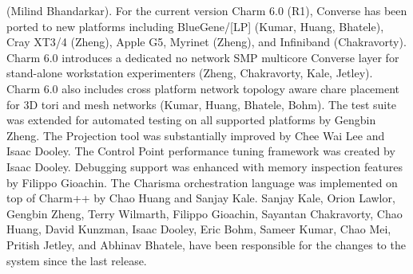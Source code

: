 (Milind Bhandarkar). For the current version Charm 6.0 (R1),
Converse has been ported to new platforms including BlueGene/[LP]
(Kumar, Huang, Bhatele), Cray XT3/4 (Zheng), Apple G5, Myrinet
(Zheng), and Infiniband (Chakravorty).  Charm 6.0 introduces a
dedicated no network SMP multicore Converse layer for stand-alone
workstation experimenters (Zheng, Chakravorty, Kale, Jetley).
Charm 6.0 also includes cross platform network topology aware
chare placement for 3D tori and mesh networks (Kumar, Huang,
Bhatele, Bohm). The test suite was extended for automated testing
on all supported platforms by Gengbin Zheng.  The Projection tool
was substantially improved by Chee Wai Lee and Isaac Dooley. The
Control Point performance tuning framework was created by Isaac
Dooley. Debugging support was enhanced with memory inspection
features by Filippo Gioachin. The Charisma orchestration language
was implemented on top of Charm++ by Chao Huang and Sanjay Kale.
Sanjay Kale, Orion Lawlor, Gengbin Zheng, Terry Wilmarth, Filippo
Gioachin, Sayantan Chakravorty, Chao Huang, David Kunzman, Isaac
Dooley, Eric Bohm, Sameer Kumar, Chao Mei, Pritish Jetley, and
Abhinav Bhatele, have been responsible for the changes to the
system since the last release. 
